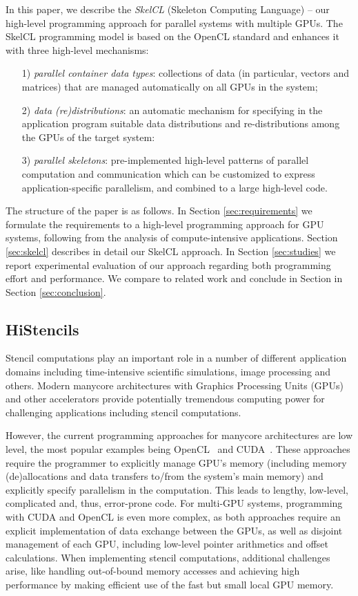 In this paper, we describe the \emph{SkelCL} (Skeleton Computing Language) -- our high-level programming approach for parallel systems with multiple GPUs.
The SkelCL programming model is based on the OpenCL standard and enhances it with three high-level mechanisms:
\begin{itemize}
  \item[1)] \emph{parallel container data types}: collections of data (in particular, vectors and matrices) that are managed automatically on all GPUs in the system;
  \item[2)] \emph{data (re)distributions}: an automatic mechanism for specifying in the application program suitable data distributions and re-distributions among the GPUs of the target system:
  \item[3)] \emph{parallel skeletons}: pre-implemented high-level patterns of parallel computation and communication which can be customized to express application-specific parallelism, and combined to a large high-level code.
\end{itemize}
The structure of the paper is as follows. 
In Section \ref{sec:requirements} we formulate the requirements to a high-level programming approach for GPU systems, following from the analysis of compute-intensive applications. 
Section \ref{sec:skelcl} describes in detail our SkelCL approach. 
In Section \ref{sec:studies} we report experimental evaluation of our approach regarding both programming effort and performance. 
We compare to related work and conclude in Section in Section \ref{sec:conclusion}. 

\subsection{HiStencils}
Stencil computations play an important role in a number of different application domains including time-intensive scientific simulations, image processing and others.
Modern manycore architectures with Graphics Processing Units (GPUs) and other accelerators provide potentially tremendous computing power for challenging applications including stencil computations.

However, the current programming approaches for manycore architectures are low level, the most popular examples being OpenCL~\cite{OpenCL} and CUDA~\cite{CUDAProgrammingGuide}.
These approaches require the programmer to explicitly manage GPU's memory (including memory (de)allocations and data transfers to/from the system's main memory) and explicitly specify parallelism in the computation.
This leads to lengthy, low-level, complicated and, thus, error-prone code.
For multi-GPU systems, programming with CUDA and OpenCL is even more complex, as both approaches require an explicit implementation of data exchange between the GPUs, as well as disjoint management of each GPU, including low-level pointer arithmetics and offset calculations.
When implementing stencil computations, additional challenges arise, like handling out-of-bound memory accesses and achieving high performance by making efficient use of the fast but small local GPU memory.

